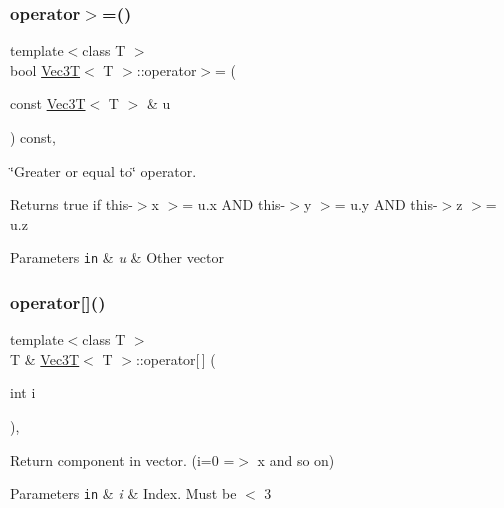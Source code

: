 \subsubsection{\texorpdfstring{operator$>$=()}{operator>=()}}
{\footnotesize\ttfamily template$<$class T $>$ \\
bool \hyperlink{classVec3T}{Vec3T}$<$ T $>$\+::operator$>$= (\begin{DoxyParamCaption}\item[{const \hyperlink{classVec3T}{Vec3T}$<$ T $>$ \&}]{u }\end{DoxyParamCaption}) const\hspace{0.3cm}{\ttfamily [inline]}, {\ttfamily [noexcept]}}



\char`\"{}\+Greater or equal to\char`\"{} operator. 

Returns true if this-\/$>$x $>$= u.\+x A\+ND this-\/$>$y $>$= u.\+y A\+ND this-\/$>$z $>$= u.\+z 
\begin{DoxyParams}[1]{Parameters}
\mbox{\tt in}  & {\em u} & Other vector \\
\hline
\end{DoxyParams}
\mbox{\label{classVec3T_a098a19968b6c7b0b76c2572e5236a71a}} 
\subsubsection{\texorpdfstring{operator[]()}{operator[]()}\hspace{0.1cm}{\footnotesize\ttfamily [1/2]}}
{\footnotesize\ttfamily template$<$class T $>$ \\
T \& \hyperlink{classVec3T}{Vec3T}$<$ T $>$\+::operator\mbox{[}$\,$\mbox{]} (\begin{DoxyParamCaption}\item[{int}]{i }\end{DoxyParamCaption})\hspace{0.3cm}{\ttfamily [inline]}, {\ttfamily [noexcept]}}



Return component in vector. (i=0 =$>$ x and so on) 


\begin{DoxyParams}[1]{Parameters}
\mbox{\tt in}  & {\em i} & Index. Must be $<$ 3 \\
\hline
\end{DoxyParams}
\mbox{\label{classVec3T_ad09224c5f7e142059d75772c0cbd1990}} 
